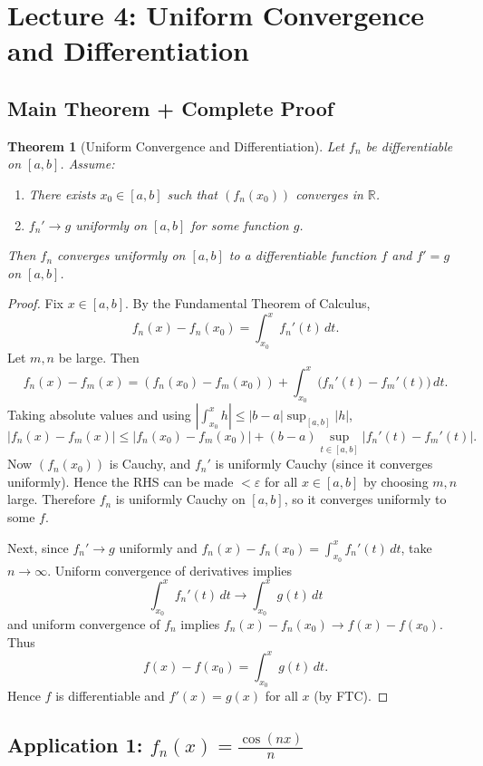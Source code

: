 \documentclass[12pt]{article}
\newtheorem{theorem}{Theorem}[section]
\theoremstyle{definition}
\begin{document}
\section{Lecture 4: Uniform Convergence and Differentiation}

\subsection{Main Theorem + Complete Proof}

\begin{theorem}[Uniform Convergence and Differentiation]
Let $f_n$ be differentiable on $[a,b]$. Assume:
\begin{enumerate}[label=(\arabic*)]
\item There exists $x_0\in[a,b]$ such that $(f_n(x_0))$ converges in $\mathbb{R}$.
\item $f_n'\to g$ uniformly on $[a,b]$ for some function $g$.
\end{enumerate}
Then $f_n$ converges uniformly on $[a,b]$ to a differentiable function $f$ and $f'=g$ on $[a,b]$.
\end{theorem}

\begin{proof}
Fix $x\in[a,b]$. By the Fundamental Theorem of Calculus,
\[
f_n(x)-f_n(x_0)=\int_{x_0}^{x} f_n'(t)\,dt.
\]
Let $m,n$ be large. Then
\[
f_n(x)-f_m(x) = (f_n(x_0)-f_m(x_0)) + \int_{x_0}^{x}\big(f_n'(t)-f_m'(t)\big)\,dt.
\]
Taking absolute values and using $| \int_{x_0}^x h|\le |b-a|\sup_{[a,b]}|h|$,
\[
|f_n(x)-f_m(x)| \le |f_n(x_0)-f_m(x_0)| + (b-a)\sup_{t\in[a,b]}|f_n'(t)-f_m'(t)|.
\]
Now $(f_n(x_0))$ is Cauchy, and $f_n'$ is uniformly Cauchy (since it converges uniformly). Hence the RHS
can be made $<\varepsilon$ for all $x\in[a,b]$ by choosing $m,n$ large.
Therefore $f_n$ is uniformly Cauchy on $[a,b]$, so it converges uniformly to some $f$.

Next, since $f_n'\to g$ uniformly and $f_n(x)-f_n(x_0)=\int_{x_0}^x f_n'(t)\,dt$, take $n\to\infty$.
Uniform convergence of derivatives implies
\[
\int_{x_0}^x f_n'(t)\,dt \to \int_{x_0}^x g(t)\,dt
\]
and uniform convergence of $f_n$ implies $f_n(x)-f_n(x_0)\to f(x)-f(x_0)$.
Thus
\[
f(x)-f(x_0) = \int_{x_0}^x g(t)\,dt.
\]
Hence $f$ is differentiable and $f'(x)=g(x)$ for all $x$ (by FTC).
\end{proof}

\subsection{Application 1: $f_n(x)=\frac{\cos(nx)}{n}$}
\end{document}
